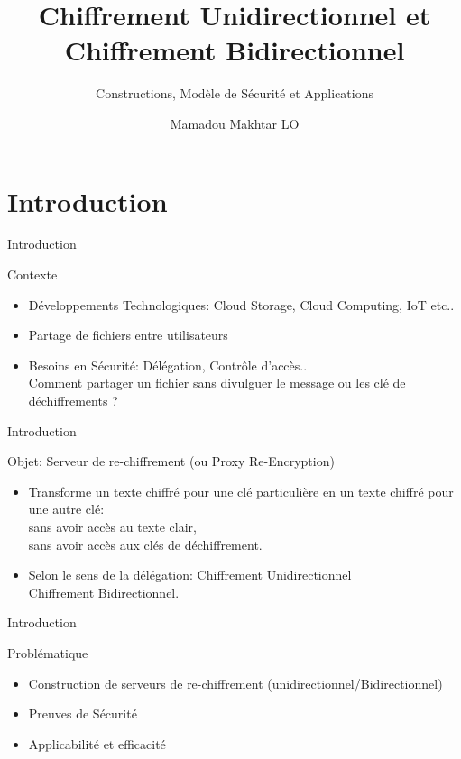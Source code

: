 \documentclass{beamer}
\title{Chiffrement Unidirectionnel et Chiffrement Bidirectionnel}
\subtitle{Constructions, Modèle de Sécurité et Applications}
\author{Mamadou Makhtar LO}
\begin{document}
\begin{frame}[plain]
    \maketitle
\end{frame}
\section*{Introduction}

\begin{frame}{Introduction}
	\begin{block}{Contexte}
	\begin{itemize}
		\item Développements Technologiques: Cloud Storage, Cloud Computing, IoT etc..
		\item Partage de fichiers entre utilisateurs
		\item Besoins en Sécurité: Délégation, Contrôle d'accès..\\
		Comment partager un fichier sans divulguer le message ou les clé de déchiffrements ? 
	\end{itemize}
\end{block}
\end{frame}

\begin{frame}{Introduction}
	\begin{block}{Objet:}
		Serveur de re-chiffrement (ou Proxy Re-Encryption)
		\begin{itemize}
			\item Transforme un texte chiffré pour une clé particulière en un texte chiffré pour une autre clé:\\
			sans avoir accès au texte clair,\\
			sans avoir accès aux clés de déchiffrement.
			\item Selon le sens de la délégation:
			Chiffrement Unidirectionnel\\
			Chiffrement Bidirectionnel.
		\end{itemize}
		
	\end{block}
\end{frame}

\begin{frame}{Introduction}
	\begin{block}{Problématique}
		\begin{itemize}
			\item Construction de serveurs de re-chiffrement (unidirectionnel/Bidirectionnel)
			\item Preuves de Sécurité
			\item Applicabilité et efficacité
		\end{itemize}
	\end{block}
\end{frame}
\end{document}
